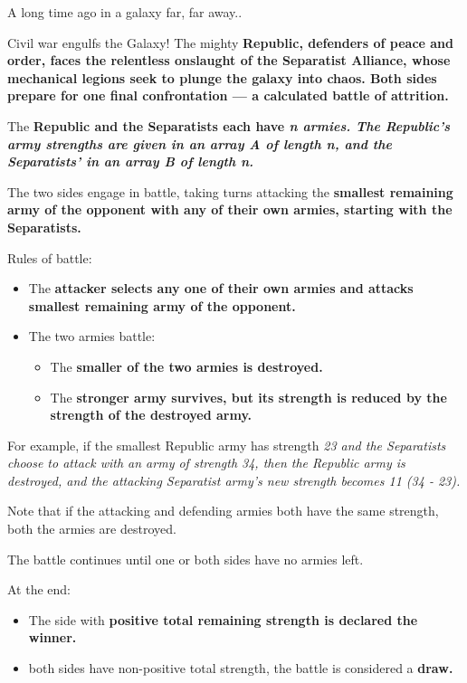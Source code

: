 
A long time ago in a galaxy far, far away..

Civil war engulfs the Galaxy! The mighty \bf{Republic}, defenders of peace and order, faces the relentless onslaught of the \bf{Separatist Alliance}, whose mechanical legions seek to plunge the galaxy into chaos. Both sides prepare for one final confrontation — a calculated battle of attrition.

The \bf{Republic} and the \bf{Separatists} each have \it{n} armies. The Republic's army strengths are given in an array \it{A} of length \it{n}, and the Separatists' in an array \it{B} of length \it{n}.

The two sides engage in battle, taking turns attacking the \bf{smallest} remaining army of the opponent with any of their own armies, starting with the \bf{Separatists}.

\large{Rules of battle}:
\begin{itemize}
  \item The \bf{attacker} selects any one of their own armies and attacks smallest remaining army of the opponent.
  \item The two armies battle: \begin{itemize}
    \item The \bf{smaller} of the two armies is destroyed.
    \item The \bf{stronger} army survives, but its strength is reduced by the strength of the destroyed army.
  \end{itemize}
\end{itemize}


For example, if the smallest Republic army has strength \it{23} and the Separatists choose to attack with an army of strength \it{34}, then the Republic army is destroyed, and the attacking Separatist army’s new strength becomes \it{11} (\it{34 - 23}).

Note that if the attacking and defending armies both have the same strength, both the armies are destroyed. 

The battle continues until one or both sides have no armies left.

At the end:
\begin{itemize}
\item The side with \bf{positive total remaining strength} is declared the \bf{winner}.
\item both sides have non-positive total strength, the battle is considered a \bf{draw}.
\end{itemize}

